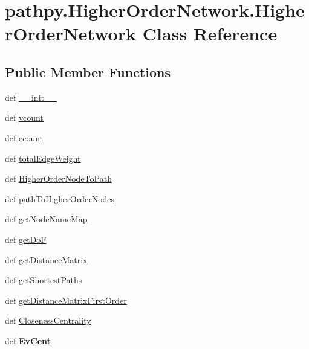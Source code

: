 \hypertarget{classpathpy_1_1HigherOrderNetwork_1_1HigherOrderNetwork}{\section{pathpy.\-Higher\-Order\-Network.\-Higher\-Order\-Network Class Reference}
\label{classpathpy_1_1HigherOrderNetwork_1_1HigherOrderNetwork}
}
\subsection*{Public Member Functions}
\begin{DoxyCompactItemize}
\item 
def \hyperlink{classpathpy_1_1HigherOrderNetwork_1_1HigherOrderNetwork_a63d36720423ee8d6d88c5a06f4655c84}{\-\_\-\-\_\-init\-\_\-\-\_\-}
\item 
def \hyperlink{classpathpy_1_1HigherOrderNetwork_1_1HigherOrderNetwork_a89ba7bbeb54449a87ba78eecc591fca4}{vcount}
\item 
def \hyperlink{classpathpy_1_1HigherOrderNetwork_1_1HigherOrderNetwork_ae425665357e88b0adf493854143a3f72}{ecount}
\item 
def \hyperlink{classpathpy_1_1HigherOrderNetwork_1_1HigherOrderNetwork_a91626f933af603a73f8bb39249ab6c51}{total\-Edge\-Weight}
\item 
def \hyperlink{classpathpy_1_1HigherOrderNetwork_1_1HigherOrderNetwork_a1963d0e4370e3818de3cf6886bba8594}{Higher\-Order\-Node\-To\-Path}
\item 
def \hyperlink{classpathpy_1_1HigherOrderNetwork_1_1HigherOrderNetwork_a117fe621fb02d356f6591620f9340eaa}{path\-To\-Higher\-Order\-Nodes}
\item 
def \hyperlink{classpathpy_1_1HigherOrderNetwork_1_1HigherOrderNetwork_abd69fc6003eb13d11390466182a63357}{get\-Node\-Name\-Map}
\item 
def \hyperlink{classpathpy_1_1HigherOrderNetwork_1_1HigherOrderNetwork_a3a03ec6087add6dd0b54f7264b2e21c5}{get\-Do\-F}
\item 
def \hyperlink{classpathpy_1_1HigherOrderNetwork_1_1HigherOrderNetwork_a20092d5a4a182df408af6063a0887630}{get\-Distance\-Matrix}
\item 
def \hyperlink{classpathpy_1_1HigherOrderNetwork_1_1HigherOrderNetwork_a672cdad613e84eb0f528bbc02e7c6163}{get\-Shortest\-Paths}
\item 
def \hyperlink{classpathpy_1_1HigherOrderNetwork_1_1HigherOrderNetwork_abed4839be0864210c0b5aff9376fe307}{get\-Distance\-Matrix\-First\-Order}
\item 
def \hyperlink{classpathpy_1_1HigherOrderNetwork_1_1HigherOrderNetwork_a2f94ebbc8141be6f5194ec922e3b01a0}{Closeness\-Centrality}
\item 
\hypertarget{classpathpy_1_1HigherOrderNetwork_1_1HigherOrderNetwork_a57e8494220dd4a5b2a9a45de17f9d26a}{def {\bfseries Ev\-Cent}}\label{classpathpy_1_1HigherOrderNetwork_1_1HigherOrderNetwork_a57e8494220dd4a5b2a9a45de17f9d26a}


\end{DoxyCompactItemize}

